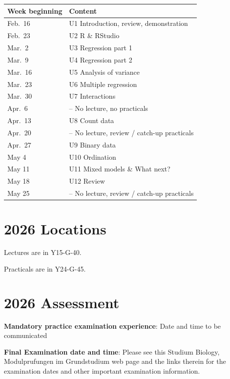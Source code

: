 \documentclass[
  letterpaper,
  8pt,
  a4paper]{book}
\begin{document}
\begin{longtable}[]{@{}ll@{}}
\toprule\noalign{}
Week beginning & Content \\
\midrule\noalign{}
\endhead
\bottomrule\noalign{}
\endlastfoot
Feb.~16 & U1 Introduction, review, demonstration \\
Feb.~23 & U2 R \& RStudio \\
Mar.~2 & U3 Regression part 1 \\
Mar.~9 & U4 Regression part 2 \\
Mar.~16 & U5 Analysis of variance \\
Mar.~23 & U6 Multiple regression \\
Mar.~30 & U7 Interactions \\
Apr.~6 & -- No lecture, no practicals \\
Apr.~13 & U8 Count data \\
Apr.~20 & -- No lecture, review / catch-up practicals \\
Apr.~27 & U9 Binary data \\
May 4 & U10 Ordination \\
May 11 & U11 Mixed models \& What next? \\
May 18 & U12 Review \\
May 25 & -- No lecture, review / catch-up practicals \\
\end{longtable}

\section*{2026 Locations}\label{locations}


Lectures are in Y15-G-40.

Practicals are in Y24-G-45.

\section*{2026 Assessment}\label{assessment-1}


\textbf{Mandatory practice examination experience}: Date and time to be
communicated

\textbf{Final Examination date and time}: Please see this Studium
Biology, Modulprufungen im Grundstudium web page and the links therein
for the examination dates and other important examination information.
\end{document}
